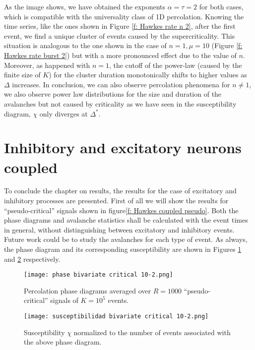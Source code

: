 As the image shows, we have obtained the exponents $\alpha=\tau=2$ for both cases, which is compatible with the universality class of 1D percolation. Knowing the time series, like the ones
shown in Figure \ref{f: Hawkes rate n 2}, after the first event, we find a unique cluster of events caused by the supercriticality. This situation is analogous to the one shown in 
the case of $n=1, \mu=10$ (Figure \ref{f: Hawkes rate burst 2}) but with a more pronounced effect due to the value of $n$. Moreover, as happened with $n=1$, the cutoff of the power-law 
(caused by the finite size of $K$) for the cluster duration monotonically shifts to higher values as $\Delta$ increases.
In conclusion, we can also observe percolation phenomena for 
$n\neq 1$, we also observe power law distributions for the size and duration of the avalanches but not caused by criticality as we have seen in the susceptibility diagram, $\chi$ only diverges
at $\Delta^*$.

\newpage
\section{Inhibitory and excitatory neurons coupled}

To conclude the chapter on results, the results for the case of excitatory and inhibitory processes are presented. First of all we will show the results for ``pseudo-critical'' 
signals shown in figure\ref{f: Hawkes coupled pseudo}. Both the phase diagrams and avalanche statistics shall be calculated with the event times in general, without distinguishing
between excitatory and inhibitory events. Future work could be to study the avalanches for each type of event. As always, the phase diagram and its corresponding susceptibility are shown in
Figures \ref{f:phase_diagram_coupled critical} and \ref{f:susceptibilidad_coupled critical} respectively.

\begin{figure}[H]
    \centering
    \texttt{[image: phase bivariate critical 10-2.png]}
    \caption{Percolation phase diagrams averaged over $R=1000$ ``pseudo-critical'' signals of $K=10^5$ events.}
    \label{f:phase_diagram_coupled critical}
\end{figure}

\begin{figure}[H]
    \centering
    \texttt{[image: susceptibilidad bivariate critical 10-2.png]}
    \caption{Susceptibility $\chi$ normalized to the number of events associated with the above phase diagram.}
    \label{f:susceptibilidad_coupled critical}
\end{figure}

